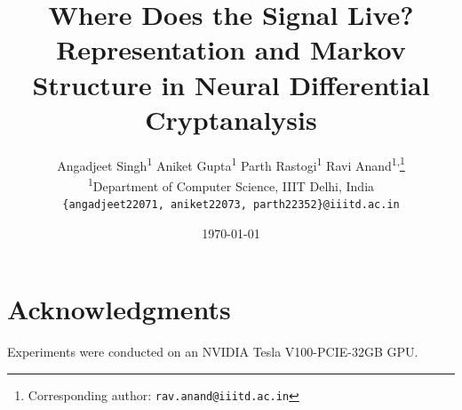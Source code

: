 \documentclass[11pt]{article}
\begin{document}
\title{Where Does the Signal Live?\\
       Representation and Markov Structure in Neural Differential Cryptanalysis}

\author{
  Angadjeet Singh\textsuperscript{1} \quad
  Aniket Gupta\textsuperscript{1} \quad
  Parth Rastogi\textsuperscript{1} \quad
  Ravi Anand\textsuperscript{1,}\thanks{Corresponding author: \texttt{rav.anand@iiitd.ac.in}} \\
  \textsuperscript{1}Department of Computer Science, IIIT Delhi, India \\
  \texttt{\{angadjeet22071, aniket22073, parth22352\}@iiitd.ac.in}
}

\date{\today}
\maketitle











\section*{Acknowledgments}
Experiments were conducted on an NVIDIA Tesla V100-PCIE-32GB GPU.




\appendix




\end{document}
